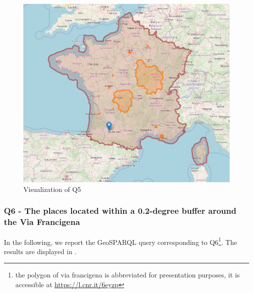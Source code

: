 \begin{figure}[h!tb]
    \centerline {\includegraphics[scale=0.6]{img/france.png}}
    \caption{Visualization of Q5}
    \label{fig:france}
\end{figure}


\subsubsection*{Q6 - The places located within a 0.2-degree buffer around the Via Francigena}
In the following, we report the GeoSPARQL query corresponding to Q6\footnote{the polygon of via francigena is abbreviated for presentation purposes, it is accessible at \url{https://l.cnr.it/6eyzp}}. The results are displayed in .

